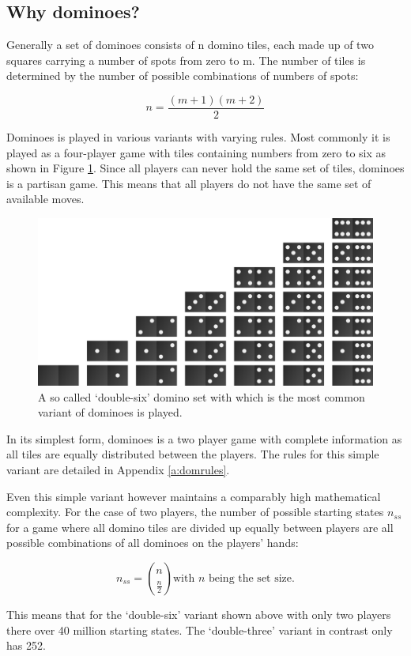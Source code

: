 \documentclass[12pt,a4paper]{article}
\begin{document}
\subsection{Why dominoes?}
Generally a set of dominoes consists of n domino tiles, each made up of two squares carrying a number of spots from zero to m. The number of tiles is determined by the number of possible combinations of numbers of spots:

\[n = \frac{(m+1)(m+2)}{2}\]


Dominoes is played in various variants with varying rules. Most commonly it is played as a four-player game with tiles containing numbers from zero to six as shown in Figure \ref{fig:dom_set}. Since all players can never hold the same set of tiles, dominoes is a partisan game. This means that all players do not have the same set of available moves.

\begin{figure}
  \center
  \includegraphics[width=0.65\linewidth]{img/dominomatrix.png}
  \caption{A so called ‘double-six’ domino set with which is the most common variant of dominoes is played.}
  \label{fig:dom_set}
\end{figure}

In its simplest form, dominoes is a two player game with complete information as all tiles are equally distributed between the players. The rules for this simple variant are detailed in Appendix \ref{a:domrules}.

Even this simple variant however maintains a comparably high mathematical complexity. For the case of two players, the number of possible starting states $n_{ss}$ for a game where all domino tiles are divided up equally between players are all possible combinations of all dominoes on the players’ hands:

\[n_{ss} = \binom{n}{\frac{n}{2}} \textrm{with $n$ being the set size.} \] 

This means that for the ‘double-six’ variant shown above with only two players there over 40 million starting states. The ‘double-three’ variant in contrast only has 252. 
\end{document}
